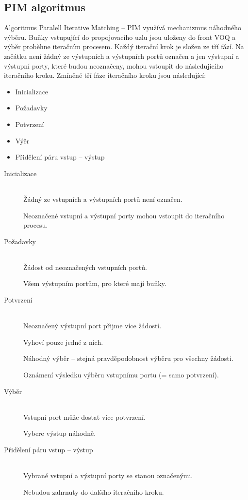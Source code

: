 \subsection{PIM algoritmus}
Algoritmus Paralell Iterative Matching -- PIM využívá mechanizmus náhodného výběru. Buňky vstupující do propojovacího uzlu jsou uloženy do front VOQ a výběr proběhne iteračním procesem. Každý iterační krok je složen ze tří fází. Na začátku není žádný ze výstupních a výstupních portů označen a jen výstupní a výstupní porty, které budou neoznačeny, mohou vstoupit do následujícího iteračního kroku. Zmíněné tří fáze iteračního kroku jsou následující:
\begin{itemize}
    \item Inicializace\par
    \item Požadavky\par
    \item Potvrzení\par
    \item Výěr\par
    \item Přidělení páru vstup -- výstup\par
\end{itemize}
\begin{description}
  \item[Inicializace] \hfill \\
  Žádný ze vstupních a výstupních portů není označen.\par
  Neoznačené vstupní a výstupní porty mohou vstoupit do iteračního procesu.
  \item[Požadavky] \hfill \\
  Žádost od neoznačených vstupních portů.\par
  Všem výstupním portům, pro které mají buňky.
  \item[Potvrzení] \hfill \\ 
  Neoznačený výstupní port přijme více žádostí.\par
  Vyhoví pouze jedné z nich. \par
  Náhodný výběr -- stejná pravděpodobnost výběru pro všechny žádosti.\par
  Oznámení výsledku výběru vstupnímu portu (= samo potvrzení).
  \item[Výběr] \hfill \\
  Vstupní port může dostat více potvrzení.\par
  Vybere výstup náhodně.
  \item[Přidělení páru vstup -- výstup] \hfill \\
  Vybrané vstupní a výstupní porty se stanou označenými.\par
  Nebudou zahrnuty do dalšího iteračního kroku.\par
\end{description}
